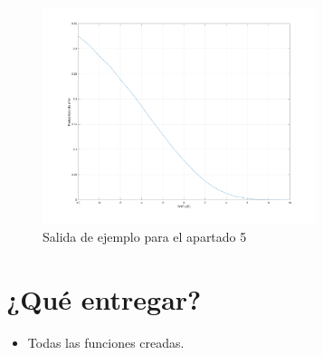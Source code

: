 \documentclass[es,practica]{uah}
\begin{document}
\begin{enumerate}
	\begin{figure}[h!]
		\centering\includegraphics[width=8cm]{../Apuntes/Figuras/Figura2}
		\caption{Salida de ejemplo para el apartado 5}
		\label{fig:figura2}
	\end{figure}

\end{enumerate}


\section{¿Qué entregar?}
\begin{itemize}
	\item Todas las funciones creadas.
\end{itemize}


\end{document}
